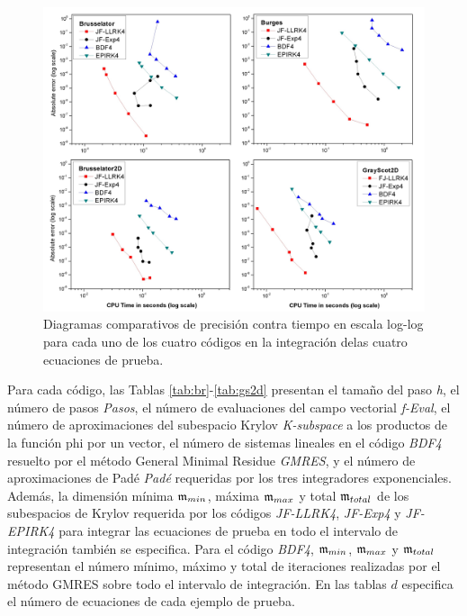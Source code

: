 \begin{figure}[htb]
	\centering
	\includegraphics[width=1\textwidth]{Graphics/lldp-fj/Diagram_new.jpg}
	\caption{Diagramas comparativos de precisión contra tiempo en escala log-log para cada uno de los cuatro códigos en la integración delas cuatro ecuaciones de prueba.} \label{work-precision diagram}
\end{figure}

Para cada código, las Tablas \ref{tab:br}-\ref{tab:gs2d} presentan el tamaño del paso \textit{h}, el número de pasos \textit{Pasos}, el número de evaluaciones del campo vectorial \textit{f-Eval}, el número de aproximaciones del subespacio Krylov \textit{K-subspace} a los productos de la función phi por un vector, el número de sistemas lineales en el código \textit{BDF4} resuelto por el método General Minimal Residue \textit {GMRES}, y el número de aproximaciones de Padé \textit{Padé} requeridas por los tres integradores exponenciales. Además, la dimensión mínima $\mathfrak{m}_{min}$, máxima $\mathfrak{m}_{max}$ y total $\mathfrak{m}_{total}$ de los subespacios de Krylov requerida por los códigos \textit{JF-LLRK4}, \textit{JF-Exp4} y \textit{JF-EPIRK4} para integrar las ecuaciones de prueba en todo el intervalo de integración también se especifica. Para el código \emph{BDF4}, $\mathfrak{m}_{min}$, $\mathfrak{m}_{max}$ y $\mathfrak{m}_{total}$ representan el número mínimo, máximo y total de iteraciones realizadas por el método GMRES sobre todo el intervalo de integración. En las tablas $d$ especifica el número de ecuaciones de cada ejemplo de prueba.

